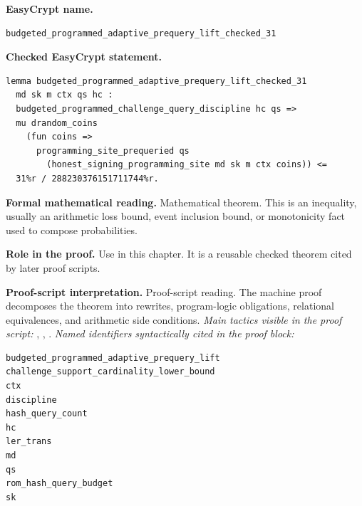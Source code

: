 \begin{formaltheorem}
\noindent\textbf{EasyCrypt name.}
\begin{lstlisting}[language=EasyCrypt,basicstyle=\ttfamily\scriptsize]
budgeted_programmed_adaptive_prequery_lift_checked_31
\end{lstlisting}
\noindent\textbf{Checked EasyCrypt statement.}
\begin{lstlisting}[language=EasyCrypt,basicstyle=\ttfamily\scriptsize]
lemma budgeted_programmed_adaptive_prequery_lift_checked_31
  md sk m ctx qs hc :
  budgeted_programmed_challenge_query_discipline hc qs =>
  mu drandom_coins
    (fun coins =>
      programming_site_prequeried qs
        (honest_signing_programming_site md sk m ctx coins)) <=
  31%r / 288230376151711744%r.
\end{lstlisting}
\noindent\textbf{Formal mathematical reading.}
Mathematical theorem. This is an inequality, usually an arithmetic loss bound, event inclusion bound, or monotonicity fact used to compose probabilities.

\noindent\textbf{Role in the proof.}
Use in this chapter. It is a reusable checked theorem cited by later proof scripts.

\noindent\textbf{Proof-script interpretation.}
Proof-script reading. The machine proof decomposes the theorem into rewrites, program-logic obligations, relational equivalences, and arithmetic side conditions.
\emph{Main tactics visible in the proof script:} , , .
\emph{Named identifiers syntactically cited in the proof block:}
\begin{lstlisting}[language=EasyCrypt,basicstyle=\ttfamily\scriptsize]
budgeted_programmed_adaptive_prequery_lift
challenge_support_cardinality_lower_bound
ctx
discipline
hash_query_count
hc
ler_trans
md
qs
rom_hash_query_budget
sk
\end{lstlisting}

\end{formaltheorem}

